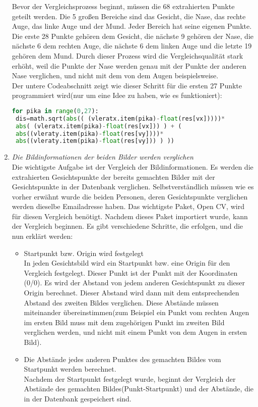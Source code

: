 \begin{enumerate}
	Bevor der Vergleichsprozess beginnt, müssen die 68 extrahierten Punkte geteilt werden. Die 5 großen Bereiche sind das Gesicht, die Nase, das rechte Auge, das linke Auge und der Mund. Jeder Bereich hat seine eigenen Punkte. Die erste 28 Punkte gehören dem Gesicht, die nächste 9 gehören der Nase, die nächste 6 dem rechten Auge, die nächste 6 dem linken Auge und die letzte 19 gehören dem Mund. Durch dieser Prozess wird die Vergleichsqualität stark erhöht, weil die Punkte der Nase werden genau mit der Punkte der anderen Nase verglichen, und nicht mit dem von dem Augen beispielsweise. \\
	Der untere Codeabschnitt zeigt wie dieser Schritt für die ersten 27 Punkte programmiert wird(nur um eine Idee zu haben, wie es funktioniert):\\

\begin{lstlisting}[language=Python]
for pika in range(0,27):
 dis=math.sqrt(abs(( (vleratx.item(pika)-float(res[vx]))))* 
 abs( (vleratx.item(pika)-float(res[vx])) ) + ( 
 abs((vleraty.item(pika)-float(res[vy])))*
 abs((vleraty.item(pika)-float(res[vy])) ) ))
\end{lstlisting}

	\item \textit{Die Bildinformationen der beiden Bilder werden verglichen} \\
	
Die wichtigste Aufgabe ist der Vergleich der Bildinformationen. Es werden die extrahierten Gesichtspunkte der bereits gemachten Bilder mit der Gesichtspunkte in der Datenbank verglichen. Selbstverständlich müssen wie es vorher erwähnt wurde die beiden Personen, deren Gesichtspunkte verglichen werden dieselbe Emailadresse haben. Das wichtigste Paket, Open CV, wird für diesen Vergleich ben{\"o}tigt. Nachdem dieses Paket importiert wurde, kann der Vergleich beginnen. Es gibt verschiedene Schritte, die erfolgen, und die nun erklärt werden:
\begin{itemize}
	\item Startpunkt bzw. Origin wird festgelegt \\
	
	In jeden Gesichtsbild wird ein Startpunkt bzw. eine Origin für den Vergleich festgelegt. Dieser Punkt ist der Punkt mit der Koordinaten (0/0). Es wird der Abstand von jedem anderen Gesichtspunkt zu dieser Origin berechnet. Dieser Abstand wird dann mit dem entsprechenden Abstand des zweiten Bildes verglichen. Diese Abstände müssen miteinander übereinstimmen(zum Beispiel ein Punkt vom rechten Augen im ersten Bild muss mit dem zugehörigen Punkt im zweiten Bild verglichen werden, und nicht mit einem Punkt von dem Augen in ersten Bild).
	\item Die Abstände jedes anderen Punktes des gemachten Bildes vom Startpunkt werden berechnet. \\
	Nachdem der Startpunkt festgelegt wurde, beginnt der Vergleich der Abstände des gemachten Bildes(Punkt-Startpunkt) und der Abstände, die in der Datenbank gespeichert sind.
	

\end{itemize}
\end{enumerate}
